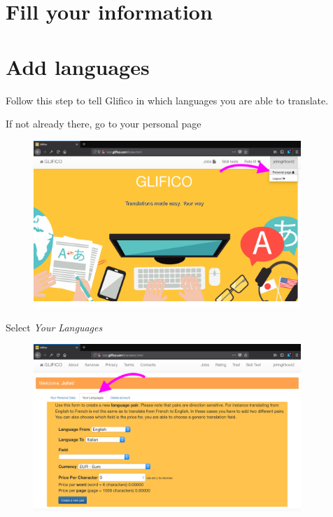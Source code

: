 \documentclass[11 pt, a4paper]{article}
\begin{document}
\clearpage
\section{Fill your information}


\clearpage
\section{Add languages}
Follow this step to tell Glifico in which languages you are able to translate.

If not already there, go to your personal page
\begin{figure}[H]
\centering
\includegraphics[width=0.9\textwidth]{translator_pair0.png}
\end{figure}

Select \textit{Your Languages}
\begin{figure}[H]
\centering
\includegraphics[width=0.9\textwidth]{translator_pair1.png}
\end{figure}
\end{document}

